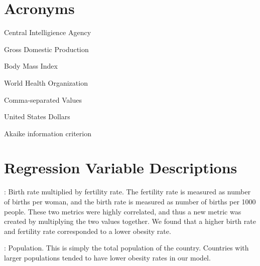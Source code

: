 \documentclass[oneside,12pt]{report}
\begin{document}
\chapter{Acronyms}\label{Acronyms}

 Central Intelligience Agency
\vspace{5pt}

 Gross Domestic Production

\vspace{5pt}

 Body Mass Index

\vspace{5pt}

 World Health Organization

\vspace{5pt}

 Comma-separated Values

\vspace{5pt}

 United States Dollars

\vspace{5pt}

 Akaike information criterion

\chapter{Regression Variable Descriptions}\label{chap:reg-vars}

: Birth rate multiplied by fertility rate. The fertility rate is measured as number of births per woman, and the birth rate is measured as number of births per 1000 people. These two metrics were highly correlated, and thus a new metric was created by multiplying the two values together. We found that a higher birth rate and fertility rate corresponded to a lower obesity rate.
\vspace{5pt}

: Population. This is simply the total population of the country. Countries with larger populations tended to have lower obesity rates in our model.
\vspace{5pt}
\end{document}
